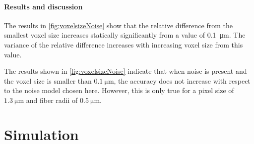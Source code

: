 \paragraph{Results and discussion}
The results in \cref{fig:voxelsizeNoise} show that the relative difference from the smallest voxel size increases statically significantly from a value of \SI{0.1}{\micro\meter}.
The variance of the relative difference increases with increasing voxel size from this value.
\par
%
The results shown in \cref{fig:voxelsizeNoise} indicate that when noise is present and the voxel size is smaller than $\SI{0.1}{\micro\meter}$, the accuracy does not increase with respect to the noise model chosen here.
However, this is only true for a pixel size of $\SI{1.3}{\micro\meter}$ and fiber radii of $\SI{0.5}{\micro\meter}$.
% 
%
%
\section{Simulation}
%
